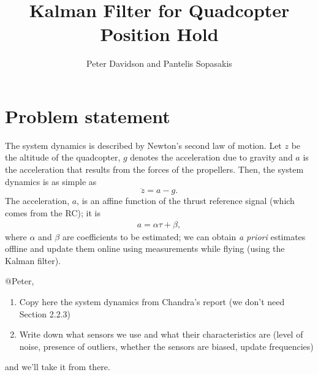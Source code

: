 \documentclass{article}
\title{Kalman Filter for Quadcopter Position Hold}
\author{Peter Davidson and Pantelis Sopasakis}
\begin{document}
\maketitle

\section{Problem statement}
The system dynamics is described by Newton's second law of motion.
Let $z$ be the altitude of the quadcopter, $g$ denotes the acceleration
due to gravity and $a$ is the acceleration that results from the forces
of the propellers. Then, the system dynamics is as simple as
\begin{equation}
    \ddot{z} = a - g.
\end{equation}
The acceleration, $a$, is an affine function of the thrust reference signal
(which comes from the RC); it is
\begin{eqnarray}
    a = \alpha \tau + \beta,
\end{eqnarray}
where $\alpha$ and $\beta$ are coefficients to be estimated; we can obtain
\textit{a priori} estimates offline and update them online using measurements
while flying (using the Kalman filter).


@Peter,
\begin{enumerate}
    \item Copy here the system dynamics from Chandra's report (we don't need Section 2.2.3)
    \item Write down what sensors we use and what their characteristics are (level of noise,
          presence of outliers, whether the sensors are biased, update frequencies)
\end{enumerate}
and we'll take it from there.

\end{document}
